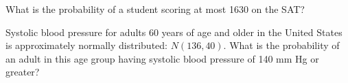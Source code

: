 \begin{exercisewrap}
\begin{nexercise}
What is the probability of a student scoring at most 1630 on the SAT?\footnotemark{}
\end{nexercise}
\end{exercisewrap}

\begin{exercisewrap}
\begin{nexercise}
Systolic blood pressure for adults 60 years of age and older in the United States is approximately normally distributed: $N(136, 40)$. What is the probability of an adult in this age group having systolic blood pressure of 140 mm Hg or greater?\footnotemark{}
\end{nexercise}
\end{exercisewrap}

\textD{\newpage}

